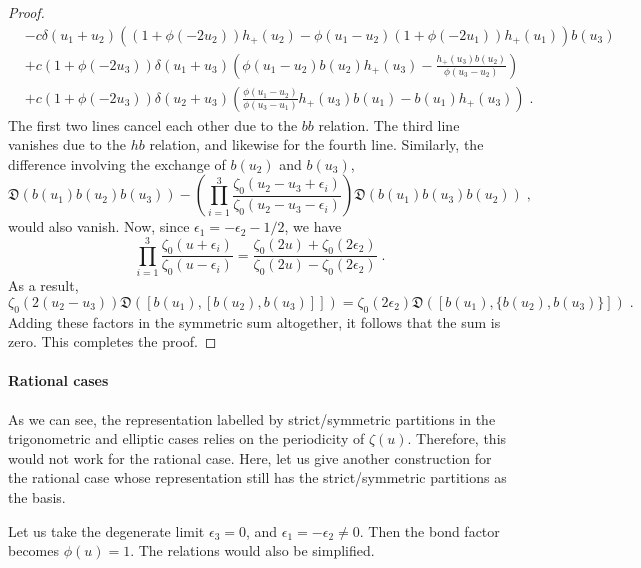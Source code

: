 \documentclass[11pt]{article}
\numberwithin{equation}{section}
\numberwithin{figure}{section}
\numberwithin{table}{section}
\begin{document}
\begin{proof}
\begin{align}
		&-c\delta(u_1+u_2)((1+\phi(-2u_2))h_+(u_2)-\phi(u_1-u_2)(1+\phi(-2u_1))h_+(u_1))b(u_3)\nonumber\\
		&+c(1+\phi(-2u_3))\delta(u_1+u_3)\left(\phi(u_1-u_2)b(u_2)h_+(u_3)-\frac{h_+(u_3)b(u_2)}{\phi(u_3-u_2)}\right)\nonumber\\
		&+c(1+\phi(-2u_3))\delta(u_2+u_3)\left(\frac{\phi(u_1-u_2)}{\phi(u_3-u_1)}h_+(u_3)b(u_1)-b(u_1)h_+(u_3)\right)\;.
	\end{align}
	The first two lines cancel each other due to the $bb$ relation. The third line vanishes due to the $hb$ relation, and likewise for the fourth line. Similarly, the difference involving the exchange of $b(u_2)$ and $b(u_3)$,
	\begin{equation}
		\mathfrak{D}(b(u_1)b(u_2)b(u_3))-\left(\prod_{i=1}^{3}\frac{\zeta_0(u_2-u_3+\epsilon_i)}{\zeta_0(u_2-u_3-\epsilon_i)}\right)\mathfrak{D}(b(u_1)b(u_3)b(u_2))\;,
	\end{equation}
	would also vanish. Now, since $\epsilon_1=-\epsilon_2-1/2$, we have
	\begin{equation}
		\prod_{i=1}^{3}\frac{\zeta_0(u+\epsilon_i)}{\zeta_0(u-\epsilon_i)}=\frac{\zeta_0(2u)+\zeta_0(2\epsilon_2)}{\zeta_0(2u)-\zeta_0(2\epsilon_2)}\;.
	\end{equation}
	As a result,
	\begin{equation}
		\zeta_0(2(u_2-u_3))\mathfrak{D}([b(u_1),[b(u_2),b(u_3)]])=\zeta_0(2\epsilon_2)\mathfrak{D}([b(u_1),\{b(u_2),b(u_3)\}])\;.
	\end{equation}
	Adding these factors in the symmetric sum altogether, it follows that the sum is zero. This completes the proof.
\end{proof}

\paragraph{Rational cases} As we can see, the representation labelled by strict/symmetric partitions in the trigonometric and elliptic cases relies on the periodicity of $\zeta(u)$. Therefore, this would not work for the rational case. Here, let us give another construction for the rational case whose representation still has the strict/symmetric partitions as the basis.

Let us take the degenerate limit $\epsilon_3=0$, and $\epsilon_1=-\epsilon_2\neq0$. Then the bond factor becomes $\phi(u)=1$. The relations would also be simplified.
\end{document}
